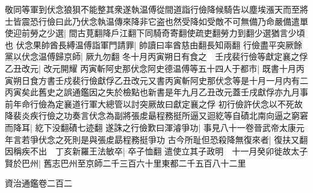 敬同等軍到伏念狼狽不能整其衆遂執温傅從間道詣行儉降候騎告以塵埃漲天而至將士皆震恐行儉曰此乃伏念執温傳來降非它盗也然受降如受敵不可無備乃命嚴備遣單使迎前勞之少選|{
	間古莧翻降戶江翻下同騎奇寄翻使疏吏翻勞力到翻少選猶言少頃也}
伏念果帥酋長縛温傅詣軍門請罪|{
	帥讀曰率酋慈由翻長知兩翻}
行儉盡平突厥餘黨以伏念温傅歸京師|{
	厥九勿翻}
冬十月丙寅朔日有食之　壬戌裴行儉等獻定襄之俘乙丑改元|{
	改元開耀}
丙寅斬阿史那伏念阿史德温傅等五十四人于都市|{
	既書十月丙寅朔日食方書壬戍裴行儉獻俘乙丑改元又書丙寅斬阿史那伏念等是十月一月内有二丙寅矣此舊史之誤通鑑因之失於檢點也新書是年九月乙丑改元蓋壬戌獻俘亦九月事前年命行儉為定襄道行軍大總管以討突厥故曰獻定襄之俘}
初行儉許伏念以不死故降裴炎疾行儉之功奏言伏念為副將張䖍朂程務挺所逼又迴紇等自磧北南向逼之窮窘而降耳|{
	紇下没翻磧七迹翻}
遂誅之行儉歎曰渾濬爭功|{
	事見八十一卷晉武帝太康元年言若爭伏念之死則是與張䖍勗程務挺爭功}
古今所耻但恐殺降無復來者|{
	復扶又翻}
因稱疾不出　丁亥新羅王法敏卒|{
	卒子恤翻}
遣使立其子政明　十一月癸卯徙故太子賢於巴州|{
	舊志巴州至京師二千三百六十里東都二千五百八十二里}


資治通鑑卷二百二
